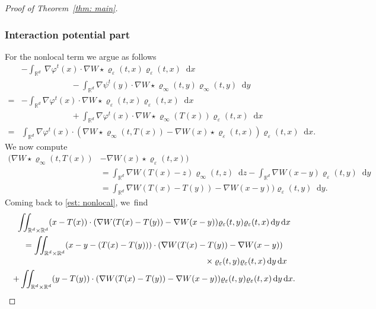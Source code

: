 \documentclass[10pt]{amsart}
\newcommand{\dx}[1]{\mathop{}\!\mathrm{d} #1}
\newcommand{\R}{\mathbb{R}}
\theoremstyle{plain}
\theoremstyle{remark}
\begin{document}
\begin{proof}[Proof of Theorem~\ref{thm: main}]
\subsubsection*{Interaction potential part}
For the nonlocal term we argue as follows\vspace*{-3pt}
\begin{equation}\label{est: nonlocal}
\begin{split}
&- \int_{\R^d}\!\ \nabla \varphi^t (x) \cdot \nabla W\star \varrho_\varepsilon (t,x) \varrho_\varepsilon(t,x) \dx x\\
&\qquad\qquad\qquad - \int_{\R^d} \nabla \psi^t (y) \cdot \nabla W\star \varrho_\infty (t,y) \varrho_\infty(t,y) \dx y\\
=&- \int_{\R^d} \nabla \varphi^t (x) \cdot \nabla W\star \varrho_\varepsilon (t,x) \varrho_\varepsilon(t,x) \dx x\\[0.2em]
&\qquad\qquad\qquad+ \int_{\R^d} \nabla \varphi^t (x) \cdot \nabla W\star \varrho_\infty (T(x)) \varrho_\varepsilon(t,x) \dx x\\
=&\int_{\R^d} \nabla \varphi^t (x) \cdot (\nabla W\star \varrho_\infty (t,T(x)) - \nabla W(x) \star\varrho_\varepsilon(t,x)) \varrho_\varepsilon(t,x) \dx x.
\end{split}
\end{equation}
We now compute
\begin{equation*}
\begin{aligned}
(\nabla W\star \varrho_\infty (t,T(x)) &- \nabla W(x) \star\varrho_\varepsilon(t,x))\\
&= \int_{\R^d} \nabla W(T(x)-z) \varrho_\infty(t,z) \dx z - \int_{\R^d} \nabla W(x-y) \varrho_\varepsilon(t,y) \dx y\\
&= \int_{\R^d} \nabla W(T(x)-T(y)) - \nabla W(x-y) )\varrho_\varepsilon(t,y) \dx y.
\end{aligned}
\end{equation*}
Coming back to \eqref{est: nonlocal}, we~find\vspace*{-5pt}
\begin{multline*}
\iint_{\R^d\times\R^d} (x- T(x))\cdot (\nabla W(T(x)-T(y)) - \nabla W(x-y)) \varrho_\varepsilon(t,y) \varrho_\varepsilon(t,x) \dx y \dx x\\
=\iint_{\R^d\times\R^d} (x-y - (T(x)-T(y)))\cdot (\nabla W(T(x)-T(y)) - \nabla W(x-y))\\[-3pt]
\shoveright{{}\times \varrho_\varepsilon(t,y) \varrho_\varepsilon(t,x) \dx y \dx x}\\
+ \iint_{\R^d\times\R^d} (y -T(y))\cdot (\nabla W(T(x)-T(y)) - \nabla W(x-y)) \varrho_\varepsilon(t,y) \varrho_\varepsilon(t,x) \dx y \dx x.

\end{multline*}
\end{proof}
\end{document}
